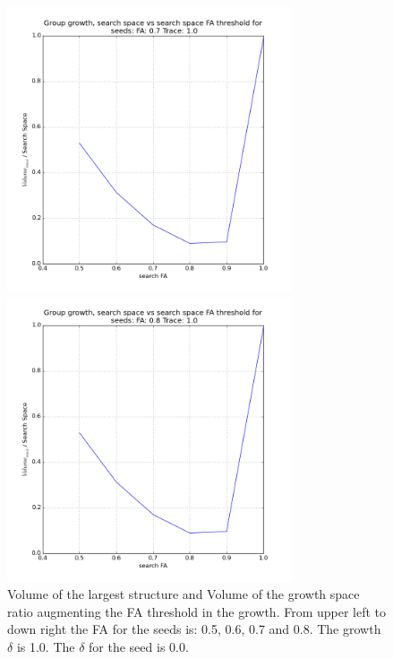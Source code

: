 \documentclass[12pt]{article}
\begin{document}
\begin{figure}[ht]
\begin{minipage}{.45\textwidth}
\end{minipage}
\begin{minipage}{.45\textwidth}
  \centering
  \includegraphics[width=0.75\textwidth]{groups/volumeplots/volumes_growth_FA07_Trace_10.png}
\end{minipage}
\begin{minipage}{.45\textwidth}
  \centering
  \includegraphics[width=0.75\textwidth]{groups/volumeplots/volumes_growth_FA08_Trace_10.png}
\end{minipage}
\caption{Volume of the largest structure and Volume of the growth space ratio augmenting the FA threshold in the growth. From upper left to down right the FA for the seeds is: 0.5, 0.6, 0.7 and 0.8. The growth $\delta$ is 1.0. The $\delta$ for the seed is 0.0.} \label{fg:vol_FA_growth}
\end{figure}
\FloatBarrier
\end{document}
